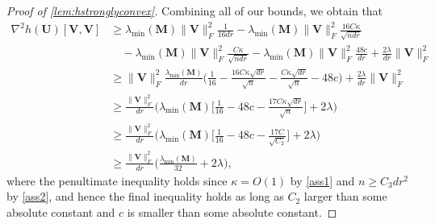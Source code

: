 \documentclass[10pt]{article}
\theoremstyle{definition}
\begin{document}
\begin{proof}[Proof of \cref{lem:hstronglyconvex}]
Combining all of our bounds, we obtain that
\begin{align}
    \nabla^2 h(\bm{U})[\bm{V},\bm{V}] &\geq \lambda_{\min}(\bm{M}) \|\bm{V}\|_F^2  \frac{1}{16 dr} - \lambda_{\min}(\bm{M}) \|\bm{V}\|_F^2  \frac{16 C \kappa }{ \sqrt{ndr }} \\
    &\quad - \lambda_{\min}(\bm{M}) \|\bm{V}\|_F^2 \frac{C\kappa}{\sqrt{ndr}} -  \lambda_{\min}(\bm{M}) \|\bm{V}\|_F^2  \frac{48 c}{dr} + \frac{2\lambda}{dr} \|\bm{V}\|_F^2 \\
    &\geq  \|\bm{V}\|_F^2 \frac{\lambda_{\min}(\bm{M})}{dr} \bigg( \frac{1}{16} - \frac{16 C \kappa \sqrt{dr}}{\sqrt{n}} - \frac{C \kappa \sqrt{dr}}{\sqrt{n}} - 48 c \bigg) + \frac{2\lambda}{dr} \|\bm{V}\|_F^2 \\
    &\geq \frac{\|\bm{V}\|_F^2}{dr} \bigg(\lambda_{\min}(\bm{M})\bigg[ \frac{1}{16} - 48 c - \frac{17 C \kappa \sqrt{dr}}{\sqrt{n}} \bigg] + 2 \lambda \bigg) \\
    &\geq \frac{\|\bm{V}\|_F^2}{dr} \bigg(\lambda_{\min}(\bm{M})\bigg[ \frac{1}{16} - 48 c - \frac{17 C }{\sqrt{C_2}} \bigg] + 2 \lambda \bigg) \\
    &\geq \frac{\|\bm{V}\|_F^2}{dr} \bigg( \frac{\lambda_{\min}(\bm{M})}{32} + 2 \lambda \bigg),
\end{align}
where the penultimate inequality holds since $\kappa = O(1)$ by \cref{ass1} and $n \geq C_3 dr^2$ by \cref{ass2}, and hence the final inequality  holds as long as $C_2$ larger than some absolute constant and $c$ is smaller than some absolute constant. 
\end{proof}
\end{document}
